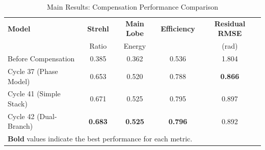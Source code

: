 \begin{table}[htbp]
\centering
\caption{Main Results: Compensation Performance Comparison}
\label{tab:main_results}
\begin{tabular}{lcccc}
\toprule
\textbf{Model} & \textbf{Strehl} & \textbf{Main Lobe} & \textbf{Efficiency} & \textbf{Residual RMSE} \\
 & Ratio & Energy & & (rad) \\
\midrule
Before Compensation & 0.385 & 0.362 & 0.536 & 1.804 \\
Cycle 37 (Phase Model) & 0.653 & 0.520 & 0.788 & \textbf{0.866} \\
Cycle 41 (Simple Stack) & 0.671 & 0.525 & 0.795 & 0.897 \\
Cycle 42 (Dual-Branch) & \textbf{0.683} & \textbf{0.525} & \textbf{0.796} & 0.892 \\
\bottomrule
\multicolumn{5}{l}{\textbf{Bold} values indicate the best performance for each metric.} \\
\end{tabular}
\end{table}
